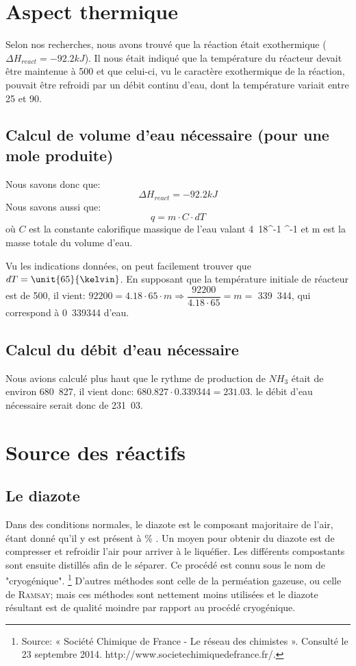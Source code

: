 \documentclass[11pt,a4paper]{report}
\begin{document}
\section*{Aspect thermique}
Selon nos recherches, nous avons trouvé que la réaction était exothermique ($\Delta H_{react} = -92.2kJ$).
Il nous était indiqué que la température du réacteur devait être maintenue à \unit{500}{\celsius} et que celui-ci, 
vu le caractère exothermique de la réaction, pouvait être refroidi par un débit continu d'eau, dont la température 
variait entre \unit{25}{\celsius} et \unit{90}{\celsius}.

\subsection*{Calcul de volume d'eau nécessaire (pour une mole produite)}
Nous savons donc que: $$\Delta H_{react} = \unit{-92.2}{kJ}$$
Nous savons aussi que:
 $$q = m \cdot C \cdot dT$$
où $C$ est la constante calorifique massique de l'eau valant \unit{4.18}{\joule \cdot \celsius^{-1} \cdot \gram^{-1}} et m est 
 la masse totale du volume d'eau.

 Vu les indications données, on peut facilement trouver que $dT=\unit{65}{\kelvin}$. En supposant que la température initiale de 
 réacteur est de \unit{500}{\celsius}, il vient: 
$92200 = 4.18 \cdot 65 \cdot m \Rightarrow \dfrac{92200}{4.18 \cdot 65} = m =$ \unit{339.344}{\gram}, qui correspond à \unit{0.339344}{\liter} d'eau.

\subsection*{Calcul du débit d'eau nécessaire}

Nous avions calculé plus haut que le rythme de production de $NH_3$ était de environ \unit{680.827}{\mole\per\second},
il vient donc:  $680.827 \cdot 0.339344 = 231.03$. 
le débit d'eau nécessaire serait donc de \unit{231.03}{\liter\per\second}.

\section*{Source des réactifs}
\subsection*{Le diazote}
Dans des conditions normales, le diazote est le composant majoritaire de l'air, étant donné qu'il y est présent à 
 \% . Un moyen pour obtenir du diazote est de compresser et refroidir l'air pour arriver à le liquéfier.
Les différents compostants sont ensuite distillés afin de le séparer. Ce procédé est connu sous le nom de "cryogénique".
\footnote{Source: « Société Chimique de France - Le réseau des chimistes ». Consulté le 23 septembre 2014. http://www.societechimiquedefrance.fr/.}
D'autres méthodes sont celle de la perméation gazeuse, ou celle de \textsc{Ramsay}; mais ces méthodes sont nettement moins utilisées
et le diazote résultant est de qualité moindre par rapport au procédé cryogénique.
\end{document}
